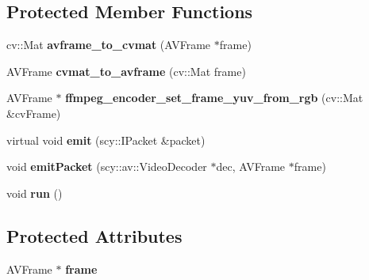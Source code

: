 \subsection*{Protected Member Functions}
\begin{DoxyCompactItemize}
\item 
\mbox{\label{class_o_c_v_video_capture_ac8adb15c8cbd79a280db0d36710ae5e6}} 
cv\+::\+Mat {\bfseries avframe\+\_\+to\+\_\+cvmat} (A\+V\+Frame $\ast$frame)
\item 
\mbox{\label{class_o_c_v_video_capture_aa9f6dc1d1714cd9329445815aa087bab}} 
A\+V\+Frame {\bfseries cvmat\+\_\+to\+\_\+avframe} (cv\+::\+Mat frame)
\item 
\mbox{\label{class_o_c_v_video_capture_a6bed9f5b73f068955647b39210c1e6ad}} 
A\+V\+Frame $\ast$ {\bfseries ffmpeg\+\_\+encoder\+\_\+set\+\_\+frame\+\_\+yuv\+\_\+from\+\_\+rgb} (cv\+::\+Mat \&cv\+Frame)
\item 
\mbox{\label{class_o_c_v_video_capture_a91b70b513b80340931e87b5df4f4b360}} 
virtual void {\bfseries emit} (scy\+::\+I\+Packet \&packet)
\item 
\mbox{\label{class_o_c_v_video_capture_ab3ee8582ba26837bd9e9595e3e43a9c6}} 
void {\bfseries emit\+Packet} (scy\+::av\+::\+Video\+Decoder $\ast$dec, A\+V\+Frame $\ast$frame)
\item 
\mbox{\label{class_o_c_v_video_capture_ae170028f0f37201fd48732e9f15967b4}} 
void {\bfseries run} ()
\end{DoxyCompactItemize}
\subsection*{Protected Attributes}
\begin{DoxyCompactItemize}
\item 
\mbox{\label{class_o_c_v_video_capture_a4fac38bd8616caf1bbbcc1583be1ae78}} 
A\+V\+Frame $\ast$ {\bfseries frame}
\end{DoxyCompactItemize}
